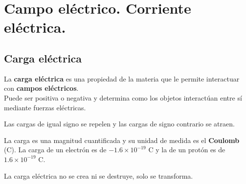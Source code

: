 \section{Campo eléctrico. Corriente eléctrica.}
\subsection{Carga eléctrica}
La \textbf{carga eléctrica} es una propiedad de la materia que le permite interactuar con \textbf{campos eléctricos}.\\ Puede ser positiva o negativa y determina como los objetos interactúan entre sí mediante fuerzas eléctricas.

\begin{proposicion}
    Las cargas de igual signo se repelen y las cargas de signo contrario se atraen.
\end{proposicion}

La carga es una magnitud cuantificada y su unidad de medida es el \textbf{Coulomb} (C). La carga de un electrón es de $-1.6 \times 10^{-19}$ C y la de un protón es de $1.6 \times 10^{-19}$ C.

\begin{proposicion}
    La carga eléctrica no se crea ni se destruye, solo se transforma.
\end{proposicion}

    